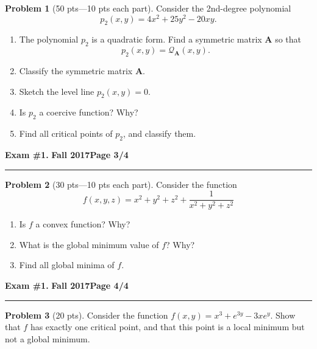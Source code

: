 \documentclass[12pt]{article}
\theoremstyle{definition}
\newtheorem{problem}{Problem}
\begin{document}
\bigskip
\begin{problem}[50 pts---10 pts each part]
Consider the 2nd-degree polynomial 
\begin{equation*}
p_2(x,y) = 4x^2 + 25y^2 - 20xy.
\end{equation*}
\begin{enumerate}
  \item The polynomial $p_2$ is a quadratic form.  Find a symmetric matrix $\boldsymbol{A}$ so that 
  \begin{equation*}
  p_2(x,y) = \mathcal{Q}_{\boldsymbol{A}}(x,y).
  \end{equation*}
  \vspace{1cm}
  \item Classify the symmetric matrix $\boldsymbol{A}$.
  \vspace{1.5cm}
  \item Sketch the level line $p_2(x,y) = 0$.  
  \begin{flushright}
  \end{flushright}
  \item Is $p_2$ a coercive function?  Why?
  \vspace{1cm}
  \item Find all critical points of $p_2$, and classify them.
\end{enumerate}
\end{problem}
\newpage


\hfill{\large\bf Exam \#1.}\hfill{\large\bf
  Fall 2017}\hfill{\large\bf Page 3/4}\hrule

\bigskip
\begin{problem}[30 pts---10 pts each part]
Consider the function
\begin{equation*}
f(x,y,z) = x^2+y^2+z^2 + \frac{1}{x^2+y^2+z^2}
\end{equation*}
\begin{enumerate}
  \item Is $f$ a convex function?  Why?
  \vspace{5cm}
  \item What is the global minimum value of $f$?  Why?
  \vspace{1cm}
  \item Find all global minima of $f$.
\end{enumerate}
\end{problem}
\newpage

\hfill{\large\bf Exam \#1.}\hfill{\large\bf
  Fall 2017}\hfill{\large\bf Page 4/4}\hrule

\bigskip
\begin{problem}[20 pts]
Consider the function $f(x,y)= x^3+e^{3y}-3xe^y$.  Show that $f$ has exactly one critical point, and that this point is a local minimum but not a global minimum.
\end{problem}
\end{document}
